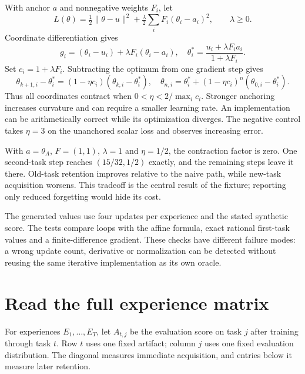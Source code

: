 With anchor $a$ and nonnegative weights $F_i$, let
\[
L(\theta)=\tfrac12\|\theta-u\|^2+
\tfrac\lambda2\sum_i F_i(\theta_i-a_i)^2,\qquad\lambda\ge0.
\]
Coordinate differentiation gives
\[
g_i=(\theta_i-u_i)+\lambda F_i(\theta_i-a_i),\quad
\theta_i^*=\frac{u_i+\lambda F_i a_i}{1+\lambda F_i}.
\]
Set $c_i=1+\lambda F_i$. Subtracting the optimum from one gradient step gives
\begin{equation}\label{evod50:contraction}
\theta_{k+1,i}-\theta_i^*=(1-\eta c_i)(\theta_{k,i}-\theta_i^*),
\quad
\theta_{n,i}=\theta_i^*+(1-\eta c_i)^n(\theta_{0,i}-\theta_i^*).
\end{equation}
Thus all coordinates contract when
$0<\eta<2/\max_i c_i$. Stronger anchoring increases curvature and can require
a smaller learning rate. An implementation can be arithmetically correct while
its optimization diverges. The negative control takes $\eta=3$ on the
unanchored scalar loss and observes increasing error.

With $a=\theta_A$, $F=(1,1)$, $\lambda=1$ and $\eta=1/2$, the contraction
factor is zero. One second-task step reaches $(15/32,1/2)$ exactly, and the
remaining steps leave it there. Old-task retention improves relative to the
naive path, while new-task acquisition worsens. This tradeoff is the central
result of the fixture; reporting only reduced forgetting would hide its cost.

\begin{center}\end{center}
The generated values use four updates per experience and the stated synthetic
score. The tests compare loops with the affine formula, exact rational first-task
values and a finite-difference gradient. These checks have different failure
modes: a wrong update count, derivative or normalization can be detected without
reusing the same iterative implementation as its own oracle.

\section{Read the full experience matrix}
For experiences $E_1,\ldots,E_T$, let $A_{t,j}$ be the evaluation score on task
$j$ after training through task $t$. Row $t$ uses one fixed artifact; column
$j$ uses one fixed evaluation distribution. The diagonal measures immediate
acquisition, and entries below it measure later retention.

